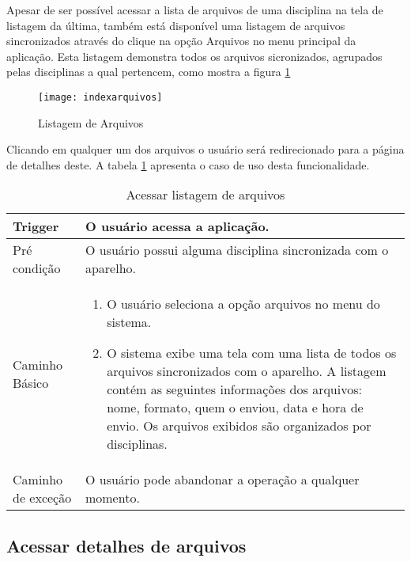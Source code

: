Apesar de ser possível acessar a lista de arquivos de uma disciplina na tela de listagem da última, também está disponível uma listagem de arquivos sincronizados através do clique na opção Arquivos no menu principal da aplicação. Esta listagem demonstra todos os arquivos sicronizados, agrupados pelas disciplinas a qual pertencem, como mostra a figura \ref{indexarquivos}

\begin{figure}[H]
    \centering
\texttt{[image: indexarquivos]}
    \caption{Listagem de Arquivos}
    \label{indexarquivos}
\end{figure}

Clicando em qualquer um dos arquivos o usuário será redirecionado para a página de detalhes deste. A tabela \ref{table:indexarquivos} apresenta o caso de uso desta funcionalidade.

\begin{table}[H]
  \begin{tabular}{ p{} | p{} }
    Trigger & O usuário acessa a aplicação.\\
    \hline
    Pré condição & O usuário possui alguma disciplina sincronizada com o aparelho.\\
    \hline
    Caminho Básico &
    \begin{minipage}{5in}
      \vskip 4pt
      \begin{enumerate}
        \item O usuário seleciona a opção arquivos no menu do sistema.
        \item O sistema exibe uma tela com uma lista de todos os arquivos sincronizados com o aparelho. A listagem contém as seguintes informações dos arquivos: nome, formato, quem o enviou, data e hora de envio. Os arquivos exibidos são organizados por disciplinas.
      \end{enumerate}
      \vskip 4pt
    \end{minipage} \\
    \hline
    Caminho de exceção & O usuário pode abandonar a operação a qualquer momento.
  \end{tabular}
  \caption{Acessar listagem de arquivos}
  \label{table:indexarquivos}
\end{table}

\subsection{Acessar detalhes de arquivos}

